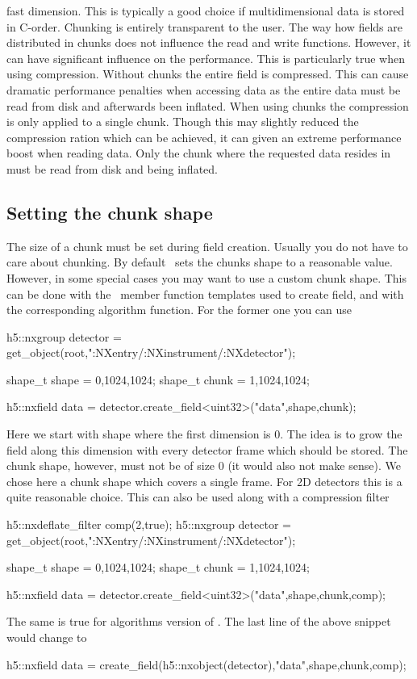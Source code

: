 fast dimension. This is typically a good choice if multidimensional data is
stored in C-order. 
Chunking is entirely transparent to the user. The way how fields are distributed
in chunks does not influence the read and write functions. However, it can have
significant influence on the performance. This is particularly true when using
compression. Without chunks the entire field is compressed. This can cause
dramatic performance penalties when accessing data as the entire data must be
read from disk and afterwards been inflated. When using chunks the compression
is only applied to a single chunk. Though this may slightly reduced the
compression ration which can be achieved, it can given an extreme performance
boost when reading data. Only the chunk where the requested data resides in must
be read from disk and being inflated. 

\subsection{Setting the chunk shape}

The size of a chunk must be set during field creation. Usually you do not have
to care about chunking. By default \libpniio\ sets the chunks shape to a
reasonable value. However, in some special cases you may want to use a 
custom chunk shape. 
This can be done with the \nxgroup\ member function templates used to create
field, and with the corresponding algorithm function. 
For the former one you can use
\begin{cppcode}
h5::nxgroup detector = get_object(root,":NXentry/:NXinstrument/:NXdetector");

shape_t shape = {0,1024,1024};
shape_t chunk = {1,1024,1024};

h5::nxfield data = detector.create_field<uint32>("data",shape,chunk);
\end{cppcode}
Here we start with shape where the first dimension is $0$. The idea is to grow
the field along this dimension with every detector frame which should be stored. 
The chunk shape, however, must not be of size $0$ (it would also not make
sense). We chose here a chunk shape which covers a single frame. For 2D
detectors this is a quite reasonable choice. 
This can also be used along with a compression filter
\begin{cppcode}
h5::nxdeflate_filter comp(2,true);
h5::nxgroup detector = get_object(root,":NXentry/:NXinstrument/:NXdetector");

shape_t shape = {0,1024,1024};
shape_t chunk = {1,1024,1024};

h5::nxfield data = detector.create_field<uint32>("data",shape,chunk,comp);
\end{cppcode}
The same is true for algorithms version of . The last line of
the above snippet would change to
\begin{cppcode}
h5::nxfield data = create_field(h5::nxobject(detector),"data",shape,chunk,comp);
\end{cppcode}


